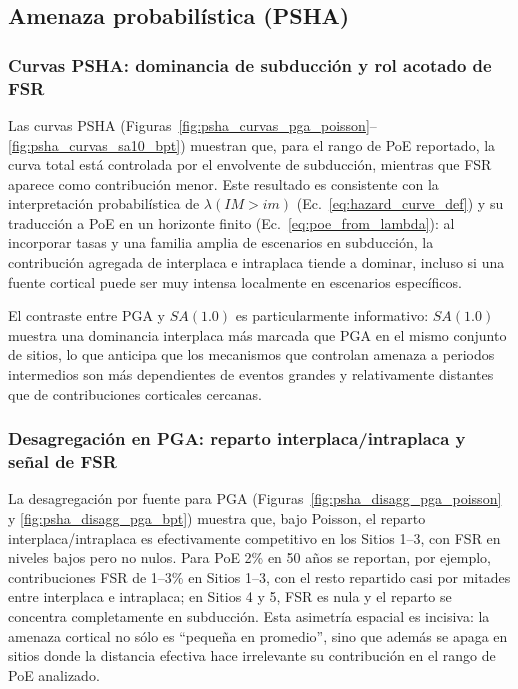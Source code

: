 \subsection{Amenaza probabilística (PSHA)}
\label{subsec:disc_psha}

\subsubsection{Curvas PSHA: dominancia de subducción y rol acotado de FSR}
\label{subsubsec:disc_psha_curvas}

Las curvas PSHA (Figuras~\ref{fig:psha_curvas_pga_poisson}--\ref{fig:psha_curvas_sa10_bpt}) muestran que, para el rango de PoE reportado, la curva total está controlada por el envolvente de subducción, mientras que FSR aparece como contribución menor. Este resultado es consistente con la interpretación probabilística de $\lambda(IM>im)$ (Ec.~\ref{eq:hazard_curve_def}) y su traducción a PoE en un horizonte finito (Ec.~\ref{eq:poe_from_lambda}): al incorporar tasas y una familia amplia de escenarios en subducción, la contribución agregada de interplaca e intraplaca tiende a dominar, incluso si una fuente cortical puede ser muy intensa localmente en escenarios específicos.

El contraste entre PGA y $SA(1.0)$ es particularmente informativo: $SA(1.0)$ muestra una dominancia interplaca más marcada que PGA en el mismo conjunto de sitios, lo que anticipa que los mecanismos que controlan amenaza a periodos intermedios son más dependientes de eventos grandes y relativamente distantes que de contribuciones corticales cercanas.

\subsubsection{Desagregación en PGA: reparto interplaca/intraplaca y señal de FSR}
\label{subsubsec:disc_psha_disagg_pga}

La desagregación por fuente para PGA (Figuras~\ref{fig:psha_disagg_pga_poisson} y \ref{fig:psha_disagg_pga_bpt}) muestra que, bajo Poisson, el reparto interplaca/intraplaca es efectivamente competitivo en los Sitios 1--3, con FSR en niveles bajos pero no nulos. Para PoE 2\% en 50 años se reportan, por ejemplo, contribuciones FSR de 1--3\% en Sitios 1--3, con el resto repartido casi por mitades entre interplaca e intraplaca; en Sitios 4 y 5, FSR es nula y el reparto se concentra completamente en subducción. Esta asimetría espacial es incisiva: la amenaza cortical no sólo es ``pequeña en promedio'', sino que además se apaga en sitios donde la distancia efectiva hace irrelevante su contribución en el rango de PoE analizado.

